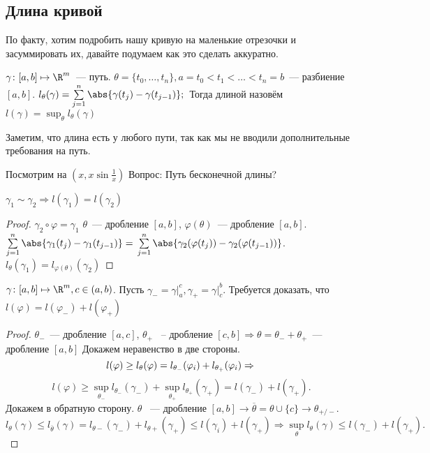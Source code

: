 \subsection{Длина кривой}
\begin{remark}
    По факту, хотим подробить нашу кривую на маленькие отрезочки
    и засуммировать их, давайте подумаем как это сделать аккуратно.
\end{remark}
\begin{definition}
    $\gamma\colon [a, b]\mapsto \R^m$~--- путь.
    $\theta = \{t_0,\dots, t_n\}, a = t_0 < t_1 < \dots < t_n = b$~---
    разбиение $[a, b]$.
    $l_\theta(\gamma) = \sum\limits_{j = 1}^{n}
    \abs{\gamma(t_j) - \gamma(t_{j - 1})};\\$
    Тогда длиной назовём  $l(\gamma) = \sup_\theta l_\theta(\gamma)$
\end{definition}
\begin{remark}
    Заметим, что длина есть у любого пути, так как мы не вводили
    дополнительные требования на путь.
\end{remark}
\begin{remark}
    Посмотрим на $(x, x\sin \frac{1}{x})$
    Вопрос: Путь бесконечной длины?
\end{remark}
\begin{theorem}
    $\gamma_1 \sim \gamma_2\Rightarrow l(\gamma_1) = l(\gamma_2)$
\end{theorem}
\begin{proof}
    $\gamma_2\circ\varphi=\gamma_1$
    $\theta$~--- дробление $[a,b]$,
    $\varphi(\theta)$~--- дробление $[a,b]$.
    $\sum\limits_{j = 1}^{n}\abs{\gamma_1(t_j) - \gamma_1(t_{j-1})}=\\
    \sum\limits_{j=1}^{n}\abs{\gamma_2(\varphi(t_j))-\gamma_2(\varphi(t_{j-1}))}$.
    $l_{\theta}(\gamma_1) = l_{\varphi(\theta)}(\gamma_2)$
\end{proof}
\begin{theorem}
    $\gamma\colon [a,b]\mapsto\R^m, c\in(a,b)$.
    Пусть $\gamma_{-}=\gamma\big|_a^c, \gamma_{+} = \gamma\big|_c^b$.
    Требуется доказать, что $l(\varphi)=l(\varphi_-) + l(\varphi_+)$
\end{theorem}
\begin{proof}
    $\theta_-$~--- дробление $[a,c]$, $\theta_+$ ~-- дробление
    $[c,b]\Rightarrow \theta = \theta_- + \theta_+$~---
    дробление $[a,b]$
    Докажем неравенство в две стороны.
    \[
        l(\varphi)\geq l_{\theta}(\varphi) = l_{\theta_-}(\varphi_i) + l_{\theta_+}(\varphi_i)\Rightarrow\\
    \]\[
        l(\varphi)\ge \sup_{\theta_-}l_{\theta_-}(\gamma_-) + 
        \sup_{\theta_+}l_{\theta_+}(\gamma_+) = l(\gamma_-) + l(\gamma_+)
    .\] 
    Докажем в обратную сторону.
    $\theta$ ~--- дробление $[a,b]\rightarrow 
    \overline{\theta} = \theta \cup \{c\}\rightarrow \theta_{+/-}$.
    \[
        l_{\theta}(\gamma)\leq l_{\overline{\theta}}(\gamma) =
        l_{\theta-}(\gamma_-) + l_{\theta+}(\gamma_+)\leq
        l(\gamma_i)+l(\gamma_+)\Rightarrow 
        \sup_{\theta}l_{\theta}(\gamma)\leq l(\gamma_-) + l(\gamma_+)
    .\] 
\end{proof}
